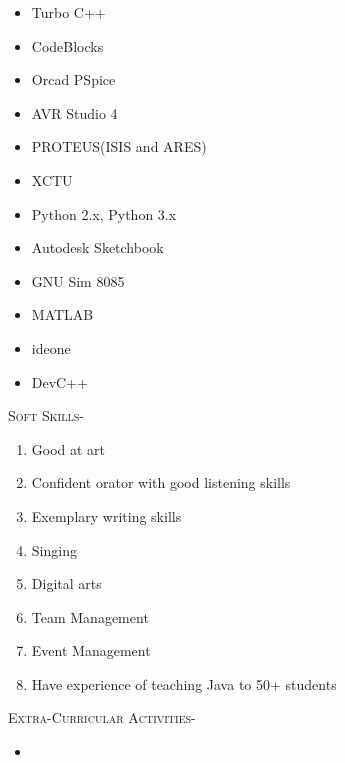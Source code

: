 \documentclass[11pt]{article}
\begin{document}
\begin{figure}[ht]
\begin{minipage}[b]{0.45\linewidth}
\begin{small}
\begin{enumerate}
\begin{itemize}
\item  Turbo C++
\item CodeBlocks
\item  Orcad PSpice
\item AVR Studio 4
\item PROTEUS(ISIS and ARES)
\item XCTU
\item Python 2.x, Python 3.x
\item Autodesk Sketchbook
\item GNU Sim 8085
\item MATLAB
\item  ideone
\item  DevC++
\end{itemize}


\end{enumerate}
\end{small}
\end{minipage}
\hspace{0.5cm}
\begin{minipage}[b]{0.45\linewidth}
\noindent\colorbox{WeakOrange}
{\parbox{\dimexpr\textwidth-2\fboxsep\relax}{\textsc{Soft Skills-}}}

\begin{small}
\begin{enumerate}
\item Good at art
\item Confident orator with good listening skills
\item Exemplary writing skills
\item Singing
\item Digital arts
\item Team Management
\item Event Management
\item Have experience of teaching Java to 50+ students
\end{enumerate}
\end{small}
\noindent\colorbox{WeakOrange}
{\parbox{\dimexpr\textwidth-2\fboxsep\relax}{\textsc{Extra-Curricular Activities-}}}
\begin{itemize}
\item 

\end{itemize}

\end{minipage}
\end{figure}
\end{document}
